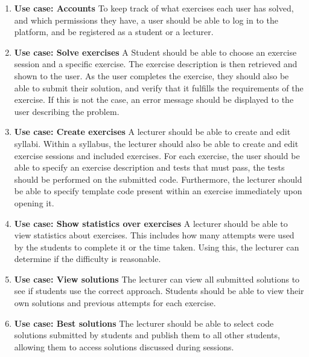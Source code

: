 \begin{enumerate}
    \item \textbf{Use case: Accounts}\newline
    To keep track of what exercises each user has solved, and which permissions they have, a user should be able to log in to the platform, and be registered as a student or a lecturer.
    \item \textbf{Use case: Solve exercises}\newline
    A Student should be able to choose an exercise session and a specific exercise. The exercise description is then retrieved and shown to the user.
    As the user completes the exercise, they should also be able to submit their solution, and verify that it fulfills the requirements of the exercise. If this is not the case, an error message should be displayed to the user describing the problem.

    \item \textbf{Use case: Create exercises}\newline
    A lecturer should be able to create and edit syllabi.
    Within a syllabus, the lecturer should also be able to create and edit exercise sessions and included exercises.
    For each exercise, the user should be able to specify an exercise description and tests that must pass, the tests should be performed on the submitted code. Furthermore, the lecturer should be able to specify template code present within an exercise immediately upon opening it.

    \item \textbf{Use case: Show statistics over exercises} \newline
    A lecturer should be able to view statistics about exercises.
    This includes how many attempts were used by the students to complete it or the time taken.
    Using this, the lecturer can determine if the difficulty is reasonable.

    \item \textbf{Use case: View solutions}\newline
    The lecturer can view all submitted solutions to see if students use the correct approach.
    Students should be able to view their own solutions and previous attempts for each exercise.

    \item \textbf{Use case: Best solutions}\newline
    The lecturer should be able to select code solutions submitted by students and publish them to all other students, allowing them to access solutions discussed during sessions.

\end{enumerate}


